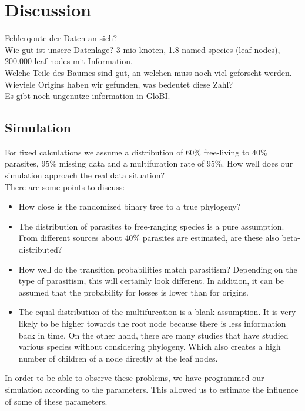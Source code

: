 \chapter{Discussion}

  Fehlerqoute der Daten an sich? \\
  Wie gut ist unsere Datenlage? 3 mio knoten, 1.8 named species (leaf nodes), 200.000 leaf nodes mit 
  Information. \\
  Welche Teile des Baumes sind gut, an welchen muss noch viel geforscht werden. \\
  Wieviele Origins haben wir gefunden, was bedeutet diese Zahl? \\
  Es gibt noch ungenutze information in GloBI.

  \section{Simulation}
    For fixed calculations we assume a distribution of 60\% free-living to 40\% parasites, 95\% 
      missing data and a multifuration rate of 95\%.
    How well does our simulation approach the real data situation? \\
    There are some points to discuss:
    \begin{itemize}
      \item How close is the randomized binary tree to a true phylogeny?
      \item The distribution of parasites to free-ranging species is a pure assumption. From different 
        sources about 40\% parasites are estimated, are these also beta-distributed?
      \item How well do the transition probabilities match parasitism? Depending on the type of 
        parasitism, this will certainly look different. In addition, it can be assumed that the 
        probability for losses is lower than for origins.
      \item The equal distribution of the multifurcation is a blank assumption. It is very likely to 
        be higher towards the root node because there is less information back in time. On the other 
        hand, there are many studies that have studied various species without considering phylogeny. 
        Which also creates a high number of children of a node directly at the leaf nodes.
    \end{itemize}
    In order to be able to observe these problems, we have programmed our simulation according to the 
      parameters. This allowed us to estimate the influence of some of these parameters.

